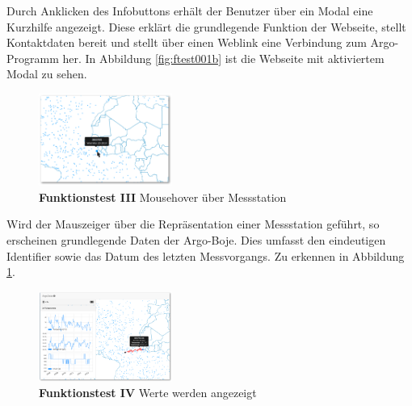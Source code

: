 Durch Anklicken des Infobuttons erhält der Benutzer über ein Modal eine Kurzhilfe angezeigt. Diese erklärt die grundlegende Funktion der Webseite, stellt Kontaktdaten bereit und stellt über einen Web\-link eine Verbindung zum Argo-Programm her. In Abbildung \ref{fig:ftest001b} ist die Webseite mit aktiviertem Modal zu sehen.
\newline\newline\newline\newline \newpage


\begin{figure}
 \centering
 \includegraphics[width=0.39\textwidth]{pix/ftest/002.png}

 \caption{\textbf{Funktionstest III} Mousehover über Messstation}
 \label{fig:ftest002}
\end{figure}

Wird der Mauszeiger über die Repräsentation einer Messstation geführt, so erscheinen grundlegende Daten der Argo-Boje. Dies umfasst den eindeutigen Identifier sowie das Datum des letzten Messvorgangs. Zu erkennen in Abbildung \ref{fig:ftest002}.
\newline\newline\newline\newline\newline


\begin{figure}
 \centering
 \includegraphics[width=0.39\textwidth]{pix/ftest/003.png}

 \caption{\textbf{Funktionstest IV} Werte werden angezeigt}
 \label{fig:ftest003}
\end{figure}

